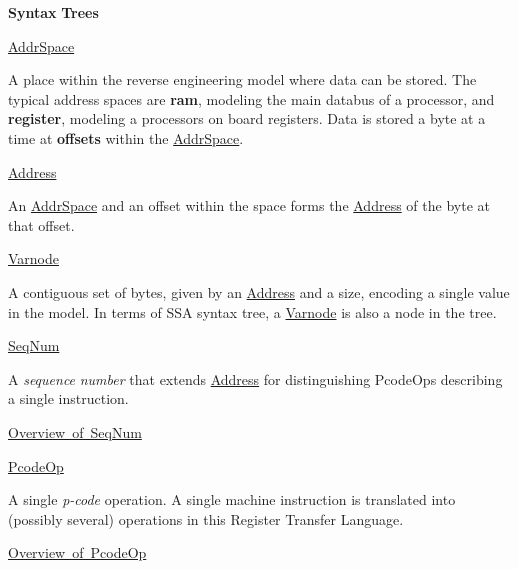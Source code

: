 {\bfseries{Syntax}} {\bfseries{Trees}} 
\begin{DoxyItemize}
\item \mbox{\hyperlink{class_addr_space}{Addr\+Space}}
\begin{DoxyItemize}
\item A place within the reverse engineering model where data can be stored. The typical address spaces are {\bfseries{ram}}, modeling the main databus of a processor, and {\bfseries{register}}, modeling a processors on board registers. Data is stored a byte at a time at {\bfseries{offsets}} within the \mbox{\hyperlink{class_addr_space}{Addr\+Space}}.
\end{DoxyItemize}
\item \mbox{\hyperlink{class_address}{Address}}
\begin{DoxyItemize}
\item An \mbox{\hyperlink{class_addr_space}{Addr\+Space}} and an offset within the space forms the \mbox{\hyperlink{class_address}{Address}} of the byte at that offset.
\end{DoxyItemize}
\item \mbox{\hyperlink{class_varnode}{Varnode}}
\begin{DoxyItemize}
\item A contiguous set of bytes, given by an \mbox{\hyperlink{class_address}{Address}} and a size, encoding a single value in the model. In terms of S\+SA syntax tree, a \mbox{\hyperlink{class_varnode}{Varnode}} is also a node in the tree.
\end{DoxyItemize}
\item \mbox{\hyperlink{class_seq_num}{Seq\+Num}}
\begin{DoxyItemize}
\item A {\itshape sequence} {\itshape number} that extends \mbox{\hyperlink{class_address}{Address}} for distinguishing Pcode\+Ops describing a single instruction.
\item \mbox{\hyperlink{coreclasses_classseqnum}{Overview of Seq\+Num}}
\end{DoxyItemize}
\item \mbox{\hyperlink{class_pcode_op}{Pcode\+Op}}
\begin{DoxyItemize}
\item A single {\itshape p-\/code} operation. A single machine instruction is translated into (possibly several) operations in this Register Transfer Language.
\item \mbox{\hyperlink{coreclasses_classpcodeop}{Overview of Pcode\+Op}}
\end{DoxyItemize}

\end{DoxyItemize}
